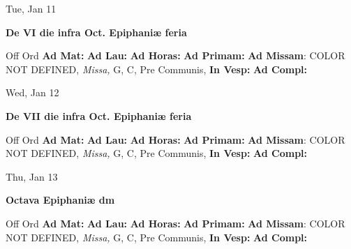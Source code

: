 \documentclass[10pt]{book}
\begin{document}
\begin{center}
\begin{minipage}{3.5in}
\vspace{2em}
\begin{center}Tue, Jan 11
\end{center}
\textbf{ \large De VI die infra Oct. Epiphaniæ
\textnormal{\normalsize feria}}

\begin{justify}Off Ord
\textbf{Ad Mat: }
\textbf{Ad Lau: }
\textbf{Ad Horas: }
\textbf{Ad Primam: }\textbf{Ad Missam}: COLOR NOT DEFINED, \textit{Missa,} G, C, Pre Communis, 
\textbf{In Vesp: }
\textbf{Ad Compl: }
\end{justify}
\end{minipage}
\end{center}

\begin{center}
\begin{minipage}{3.5in}
\vspace{2em}
\begin{center}Wed, Jan 12
\end{center}
\textbf{ \large De VII die infra Oct. Epiphaniæ
\textnormal{\normalsize feria}}

\begin{justify}Off Ord
\textbf{Ad Mat: }
\textbf{Ad Lau: }
\textbf{Ad Horas: }
\textbf{Ad Primam: }\textbf{Ad Missam}: COLOR NOT DEFINED, \textit{Missa,} G, C, Pre Communis, 
\textbf{In Vesp: }
\textbf{Ad Compl: }
\end{justify}
\end{minipage}
\end{center}

\begin{center}
\begin{minipage}{3.5in}
\vspace{2em}
\begin{center}Thu, Jan 13
\end{center}
\textbf{ \large Octava Epiphaniæ
\textnormal{\normalsize dm}}

\begin{justify}Off Ord
\textbf{Ad Mat: }
\textbf{Ad Lau: }
\textbf{Ad Horas: }
\textbf{Ad Primam: }\textbf{Ad Missam}: COLOR NOT DEFINED, \textit{Missa,} G, C, Pre Communis, 
\textbf{In Vesp: }
\textbf{Ad Compl: }
\end{justify}
\end{minipage}
\end{center}
\end{document}
